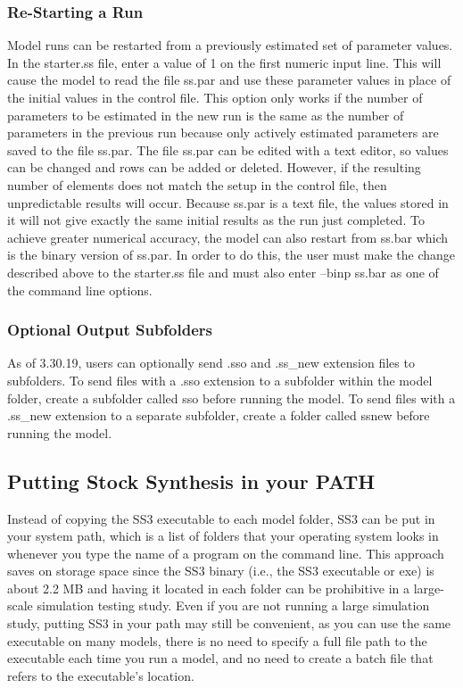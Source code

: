 \subsubsection{Re-Starting a Run}
Model runs can be restarted from a previously estimated set of parameter values. In the starter.ss file, enter a value of 1 on the first numeric input line. This will cause the model to read the file ss.par and use these parameter values in place of the initial values in the control file. This option only works if the number of parameters to be estimated in the new run is the same as the number of parameters in the previous run because only actively estimated parameters are saved to the file ss.par. The file ss.par can be edited with a text editor, so values can be changed and rows can be added or deleted.  However, if the resulting number of elements does not match the setup in the control file, then unpredictable results will occur. Because ss.par is a text file, the values stored in it will not give exactly the same initial results as the run just completed. To achieve greater numerical accuracy, the model can also restart from ss.bar which is the binary version of ss.par. In order to do this, the user must make the change described above to the starter.ss file and must also enter –binp ss.bar as one of the command line options.

\subsubsection{Optional Output Subfolders}
As of 3.30.19, users can optionally send .sso and .ss\_new extension files to subfolders. To send files with a .sso extension to a subfolder within the model folder, create a subfolder called sso before running the model. To send files with a .ss\_new extension to a separate subfolder, create a folder called ssnew before running the model.

\subsection{Putting Stock Synthesis in your PATH}

Instead of copying the SS3 executable to each model folder, SS3 can be put in your system path, which is a list of folders that your operating system looks in whenever you type the name of a program on the command line. This approach saves on storage space since the SS3 binary (i.e., the SS3 executable or exe) is about 2.2 MB and having it located in each folder can be prohibitive in a large-scale simulation testing study. Even if you are not running a large simulation study, putting SS3 in your path may still be convenient, as you can use the same executable on many models, there is no need to specify a full file path to the executable each time you run a model, and no need to create a batch file that refers to the executable's location.

